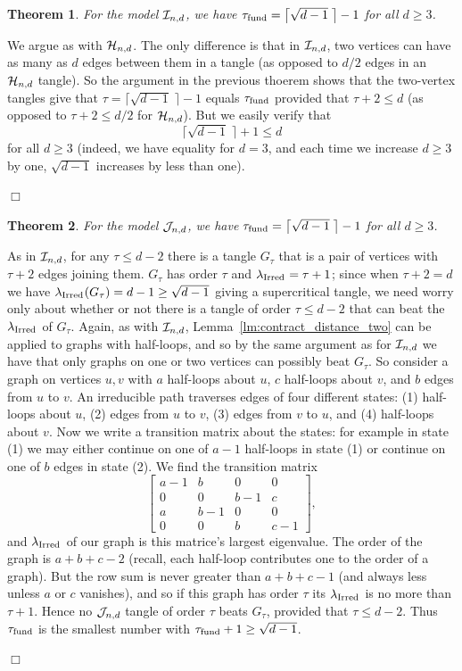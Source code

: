 \documentclass[12pt]{article}
\newtheorem{theorem}{Theorem}[section]
\newcommand{\ch}{{\cal H}}
\newcommand{\ci}{{\cal I}}
\newcommand{\cj}{{\cal J}}
\newcommand{\cjnd}{\cj_{n,d}}
\newcommand{\cind}{\ci_{n,d}}
\newcommand{\chnd}{\ch_{n,d}}
\newcommand{\fund}{{\rm fund}}
\newcommand{\taufund}{{\tau_\fund}}
\newcommand{\proof}{{\par\noindent {\bf Proof}\space\space}}
\newcommand{\proofbox}{\begin{flushright}$\Box$\end{flushright}}
\newcommand{\ird}[1]{{\rm Irred}_{#1}}
\begin{document}
\begin{theorem} For the model $\cind$, we have
$\taufund=\bigl\lceil \sqrt{d-1}\;\bigr\rceil-1$ for all $d\ge 3$.
\end{theorem}
\proof We argue as with $\chnd$.  The only difference is that in 
$\cind$, two vertices can have as many as $d$ edges between them
in a tangle (as opposed to $d/2$ edges in an $\chnd$ tangle).  So
the argument in the previous thoerem shows that the two-vertex tangles
give that $\tau=\bigl\lceil \sqrt{d-1} \;\bigr\rceil-1$ equals $\taufund$ provided
that $\tau+2\le d$ (as opposed to $\tau+2\le d/2$ for $\chnd$).
But we easily verify that
$$
\bigl\lceil \sqrt{d-1} \;\bigr\rceil+1 \le d
$$
for all $d\ge 3$ (indeed, we have equality for $d=3$, and
each time we increase $d\ge 3$ by one, $\sqrt{d-1}$
increases by less than one).
\proofbox


\begin{theorem} For the model $\cjnd$, we have
$\taufund=\bigl\lceil \sqrt{d-1}\;\bigr\rceil-1$ for all $d\ge 3$.
\end{theorem}
\proof 
As in $\cind$, for any $\tau\le d-2$ there is a tangle $G_\tau$ that is
a pair of vertices 
with $\tau+2$ edges
joining them.  $G_\tau$ has order $\tau$ and $\lambda_{\ird{}}=\tau+1$; since
when $\tau+2=d$ we have $\lambda_{\ird{}}(G_\tau)
=d-1\ge \sqrt{d-1}$ giving a supercritical
tangle, we need worry only about whether or not there is a tangle
of order $\tau\le d-2$ that can beat the $\lambda_{\ird{}}$ of $G_\tau$.
Again, as with $\cind$,
Lemma~\ref{lm:contract_distance_two} can be applied to graphs with
half-loops, and so by the same argument as for $\cind$ we have that
only graphs on one or two vertices can possibly beat $G_\tau$.
So consider a graph on vertices $u,v$ with $a$ half-loops about $u$,
$c$ half-loops about $v$, and $b$ edges from $u$ to $v$.  An irreducible
path traverses edges of four different states: (1) half-loops about $u$,
(2) edges from $u$ to $v$, (3) edges from $v$ to $u$, and (4) half-loops
about $v$.  Now we write a transition matrix about the states:  for example
in state (1) we may either continue on one of $a-1$ half-loops in state (1)
or continue on one of $b$ edges in state (2).  We find the transition
matrix
$$
\left[ \begin{array}{cccc}a-1&b&0&0\\0&0&b-1&c\\a&b-1&0&0\\0&0&b&c-1
\end{array}\right],
$$
and $\lambda_{\ird{}}$ of our graph is this matrice's largest eigenvalue.
The order of the graph is $a+b+c-2$
(recall, each half-loop
contributes one to the order of a graph).
But the row sum is never greater than $a+b+c-1$ (and always less unless
$a$ or $c$ vanishes), and so if this graph
has order $\tau$ its $\lambda_{\ird{}}$ is no more than $\tau+1$.
Hence
no $\cjnd$ tangle of order $\tau$ beats $G_\tau$, provided that
$\tau\le d-2$.  Thus
$\taufund$ is the smallest number with $\taufund+1\ge \sqrt{d-1}$.
\proofbox
\end{document}
